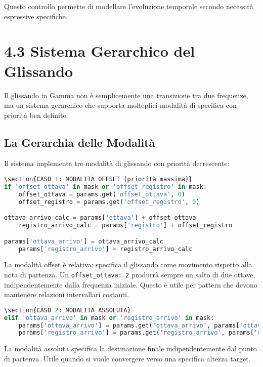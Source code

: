 Questo controllo permette di modellare l'evoluzione temporale secondo necessità espressive specifiche.
\section{4.3 Sistema Gerarchico del Glissando}
Il glissando in Gamma non è semplicemente una transizione tra due frequenze, ma un sistema gerarchico che supporta molteplici modalità di specifica con priorità ben definite.
\subsection{La Gerarchia delle Modalità}
Il sistema implementa tre modalità di glissando con priorità decrescente:

\begin{lstlisting}[language=Python]
\section{CASO 1: MODALITÀ OFFSET (priorità massima)}
if 'offset_ottava' in mask or 'offset_registro' in mask:
    offset_ottava = params.get('offset_ottava', 0)
    offset_registro = params.get('offset_registro', 0)

ottava_arrivo_calc = params['ottava'] + offset_ottava
    registro_arrivo_calc = params['registro'] + offset_registro

params['ottava_arrivo'] = ottava_arrivo_calc
    params['registro_arrivo'] = registro_arrivo_calc
\end{lstlisting}

La modalità offset è relativa: specifica il glissando come movimento rispetto alla nota di partenza. Un \texttt{offset\_ottava: 2} produrrà sempre un salto di due ottave, indipendentemente dalla frequenza iniziale. Questo è utile per pattern che devono mantenere relazioni intervallari costanti.

\begin{lstlisting}[language=Python]
\section{CASO 2: MODALITÀ ASSOLUTA}
elif 'ottava_arrivo' in mask or 'registro_arrivo' in mask:
    params['ottava_arrivo'] = params.get('ottava_arrivo', params['ottava'])
    params['registro_arrivo'] = params.get('registro_arrivo', params['registro'])
\end{lstlisting}

La modalità assoluta specifica la destinazione finale indipendentemente dal punto di partenza. Utile quando si vuole convergere verso una specifica altezza target.

